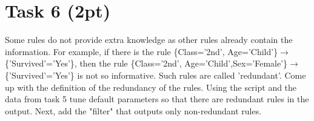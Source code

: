 \documentclass{article}
\begin{document}
\section*{Task 6 (2pt)}
Some rules do not provide extra knowledge as other rules already  contain the information. For example, if there is the rule \{Class='2nd', Age='Child'\}$\rightarrow$\\\{'Survived'='Yes'\}, then the rule \{Class='2nd', Age='Child',Sex='Female'\}$\rightarrow$\\\{'Survived'='Yes'\} is not so informative. Such rules are called 'redundant'. Come up with the definition of the redundancy of the rules. Using the script and the data from task 5 tune default parameters so that there are redundant rules in the output. Next, add the "filter" that outputs only non-redundant rules. 
\end{document}
